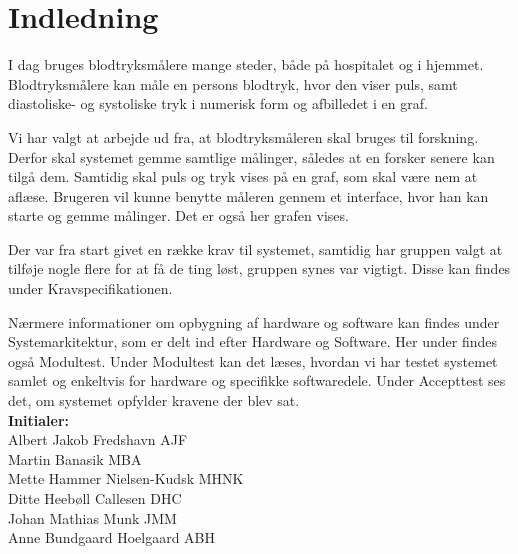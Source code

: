 \chapter{Indledning}
I  dag bruges blodtryksmålere mange steder, både på hospitalet og i hjemmet. Blodtryksmålere kan måle en persons blodtryk, hvor den viser puls, samt diastoliske- og systoliske tryk i numerisk form og afbilledet i en graf. 

Vi har valgt at arbejde ud fra, at blodtryksmåleren skal bruges til forskning. Derfor skal systemet gemme samtlige målinger, således at en forsker senere kan tilgå dem. Samtidig skal puls og tryk vises på en graf, som skal være nem at aflæse. Brugeren vil kunne benytte måleren gennem et interface, hvor han kan starte og gemme målinger. Det er også her grafen vises.

Der var fra start givet en række krav til systemet, samtidig har gruppen valgt at tilføje nogle flere for at få de ting løst, gruppen synes var vigtigt. Disse kan findes under Kravspecifikationen.

Nærmere informationer om opbygning af hardware og software kan findes under Systemarkitektur, som er delt ind efter Hardware og Software. Her under findes også Modultest. 
Under Modultest kan det læses, hvordan vi har testet systemet samlet og enkeltvis for hardware og specifikke softwaredele. Under Accepttest ses det, om systemet opfylder kravene der blev sat.\\ 


\textbf{Initialer: } \\
Albert Jakob Fredshavn \tab AJF \\
Martin Banasik \tab MBA \\
Mette Hammer Nielsen-Kudsk \tab MHNK \\
Ditte Heebøll Callesen \tab DHC \\
Johan Mathias Munk \tab JMM \\
Anne Bundgaard Hoelgaard \tab ABH \\

